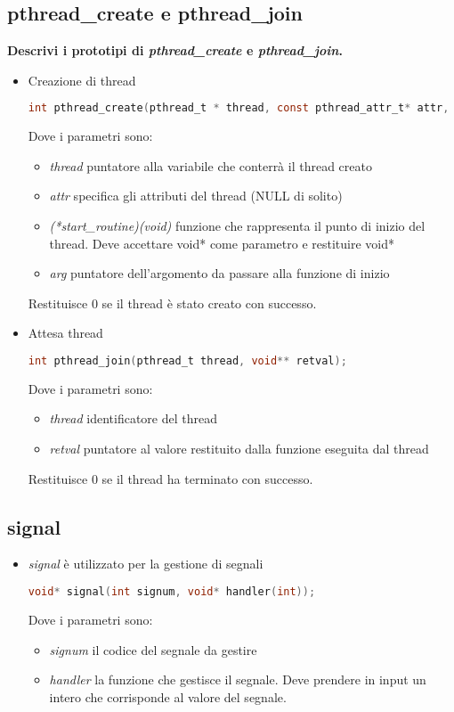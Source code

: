 \documentclass[a4paper,10pt]{article}
\theoremstyle{remark}
\theoremstyle{definition}
\theoremstyle{plain}
\theoremstyle{definition}
\theoremstyle{definition}
\theoremstyle{definition}
\theoremstyle{plain}
\theoremstyle{plain}
\begin{document}
\subsection{pthread\_create e pthread\_join}
\textbf{Descrivi i prototipi di \textit{pthread\_create} e \textit{pthread\_join}.}\\
\begin{itemize}
	\item Creazione di thread
	\begin{lstlisting}[language=C]
		int pthread_create(pthread_t * thread, const pthread_attr_t* attr, void * (*start_routine)(void), void* arg);
	\end{lstlisting}
	Dove i parametri sono:
	\begin{itemize}
		\item \textit{thread} puntatore alla variabile che conterrà il thread creato
		\item \textit{attr} specifica gli attributi del thread (NULL di solito)
		\item \textit{(*start\_routine)(void)} funzione che rappresenta il punto di inizio del thread. Deve accettare void* come parametro e restituire void*
		\item \textit{arg} puntatore dell'argomento da passare alla funzione di inizio
	\end{itemize}
	Restituisce $0$ se il thread è stato creato con successo.
	\item Attesa thread
	\begin{lstlisting}[language=C]
		int pthread_join(pthread_t thread, void** retval);
	\end{lstlisting}
	Dove i parametri sono:
	\begin{itemize}
		\item \textit{thread} identificatore del thread
		\item \textit{retval} puntatore al valore restituito dalla funzione eseguita dal thread
	\end{itemize}
	Restituisce $0$ se il thread ha terminato con successo.
\end{itemize}
\subsection{signal}
\begin{itemize}
	\item \textit{signal} è utilizzato per la gestione di segnali
	\begin{lstlisting}[language=C]
		void* signal(int signum, void* handler(int));
	\end{lstlisting}
	Dove i parametri sono:
	\begin{itemize}
		\item \textit{signum} il codice del segnale da gestire
		\item \textit{handler} la funzione che gestisce il segnale. Deve prendere in input un intero che corrisponde al valore del segnale.
	\end{itemize}
\end{itemize}
\end{document}

